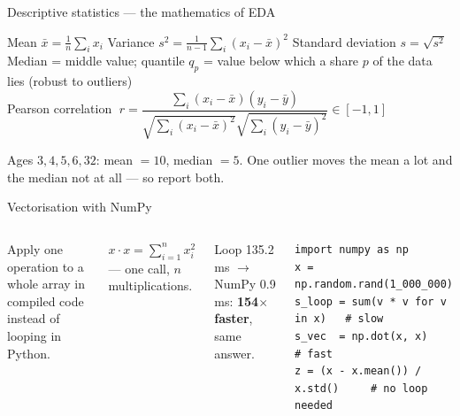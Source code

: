 \documentclass[aspectratio=169,11pt]{beamer}
\begin{document}
\begin{frame}{Descriptive statistics --- the mathematics of EDA}
\begin{bmath}
Mean $\bar x=\frac1n\sum_i x_i$ \qquad Variance $s^2=\frac{1}{n-1}\sum_i (x_i-\bar x)^2$ \qquad Standard deviation $s=\sqrt{s^2}$\\[3pt]
Median = middle value; quantile $q_p$ = value below which a share $p$ of the data lies (robust to outliers)\\[3pt]
Pearson correlation $\;r=\dfrac{\sum_i (x_i-\bar x)(y_i-\bar y)}{\sqrt{\sum_i (x_i-\bar x)^2}\sqrt{\sum_i (y_i-\bar y)^2}}\in[-1,1]$
\end{bmath}
\begin{bex}
Ages $3,4,5,6,32$: mean $=10$, median $=5$. One outlier moves the mean a lot and the median not at all --- so report both.
\end{bex}
\end{frame}

\begin{frame}[fragile]{Vectorisation with NumPy}
\begin{columns}[T]
\begin{bdef}[Vectorisation]
Apply one operation to a whole array in compiled code instead of looping in Python.
\end{bdef}
\begin{bmath}
$x\cdot x=\sum_{i=1}^{n}x_i^2$ --- one call, $n$ multiplications.
\end{bmath}
\begin{bres}
Loop 135.2 ms $\rightarrow$ NumPy 0.9 ms: \textbf{154$\times$ faster}, same answer.
\end{bres}
\begin{bcode}
\begin{lstlisting}
import numpy as np
x = np.random.rand(1_000_000)
s_loop = sum(v * v for v in x)   # slow
s_vec  = np.dot(x, x)            # fast
z = (x - x.mean()) / x.std()     # no loop needed
\end{lstlisting}
\end{bcode}
\end{columns}
\end{frame}
\end{document}
